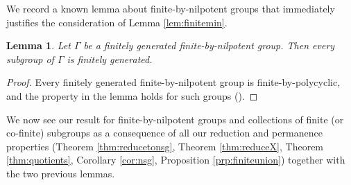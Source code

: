 \documentclass[11pt, oneside, reqno]{amsart}
\newtheorem{lem}[thm]{Lemma}
\theoremstyle{definition}
\theoremstyle{remark}
\numberwithin{equation}{section}
\begin{document}
\vspace{0.3cm}
We record a known lemma about finite-by-nilpotent groups that immediately justifies the consideration of Lemma \ref{lem:finitemin}.

\begin{lem}
\label{lem:fbnlemma}
    Let $\Gamma$ be a finitely generated finite-by-nilpotent group. Then every subgroup of $\Gamma$ is finitely generated.
\end{lem}

\begin{proof}
    Every finitely generated finite-by-nilpotent group is finite-by-polycyclic, and the property in the lemma holds for such groups (\cite{H54}).
\end{proof}


We now see our result for finite-by-nilpotent groups and collections of finite (or co-finite) subgroups as a consequence of all our reduction and permanence properties  (Theorem \ref{thm:reducetonsg}, Theorem \ref{thm:reduceX}, Theorem \ref{thm:quotients}, Corollary \ref{cor:nsg}, Proposition \ref{prp:finiteunion}) together with the two previous lemmas.
\end{document}
